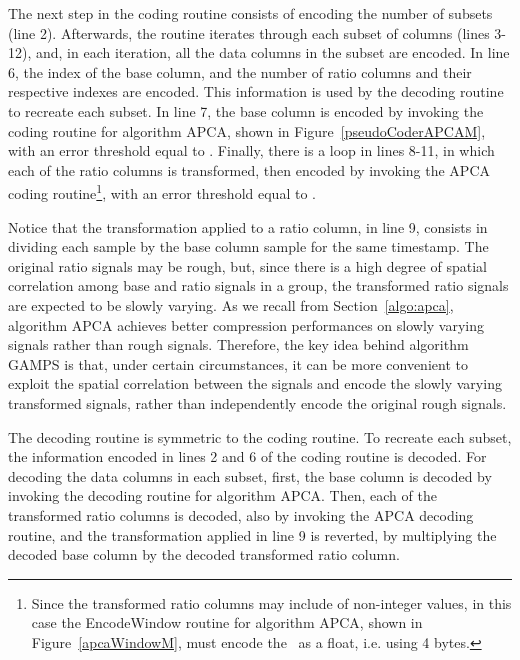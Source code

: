 The next step in the coding routine consists of encoding the number of subsets (line 2). Afterwards, the routine iterates through each subset of columns (lines 3-12), and, in each iteration, all the data columns in the subset are encoded. In line 6, the index of the base column, and the number of ratio columns and their respective indexes are encoded. This information is used by the decoding routine to recreate each subset. In line 7, the base column is encoded by invoking the coding routine for algorithm APCA, shown in Figure~\ref{pseudoCoderAPCAM}, with an error threshold equal to \epsilonB. Finally, there is a loop in lines 8-11, in which each of the ratio columns is transformed, then encoded by invoking the APCA coding routine\footnote{Since the transformed ratio columns may include of non-integer values, in this case the EncodeWindow routine for algorithm APCA, shown in Figure~\ref{apcaWindowM}, must encode the \midrange\ as a float, i.e. using 4 bytes.}, with an error threshold equal to \epsilonR.


Notice that the transformation applied to a ratio column, in line 9, consists in dividing each sample by the base column sample for the same timestamp. The original ratio signals may be rough, but, since there is a high degree of spatial correlation among base and ratio signals in a group, the transformed ratio signals are expected to be slowly varying. As we recall from Section~\ref{algo:apca}, algorithm APCA achieves better compression performances on slowly varying signals rather than rough signals. Therefore, the key idea behind algorithm GAMPS is that, under certain circumstances, it can be more convenient to exploit the spatial correlation between the signals and encode the slowly varying transformed signals, rather than independently encode the original rough signals.


The decoding routine is symmetric to the coding routine. To recreate each subset, the information encoded in lines 2 and 6 of the coding routine is decoded. For decoding the data columns in each subset, first, the base column is decoded by invoking the decoding routine for algorithm APCA. Then, each of the transformed ratio columns is decoded, also by invoking the APCA decoding routine, and the transformation applied in line 9 is reverted, by multiplying the decoded base column by the decoded transformed ratio column.




